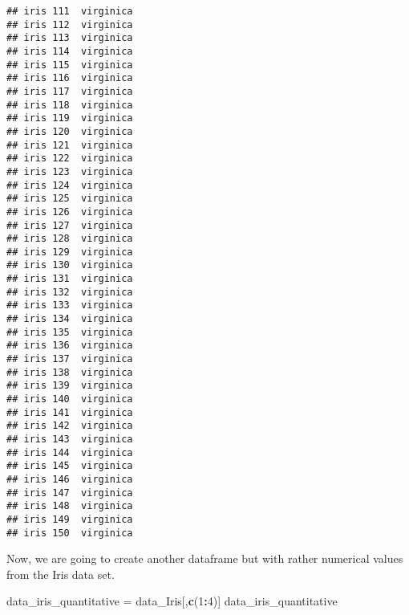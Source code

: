 \documentclass[
]{article}
\newenvironment{Shaded}{\begin{snugshade}}{\end{snugshade}}
\newcommand{\DecValTok}[1]{\textcolor[rgb]{0.00,0.00,0.81}{#1}}
\newcommand{\FunctionTok}[1]{\textcolor[rgb]{0.13,0.29,0.53}{\textbf{#1}}}
\newcommand{\NormalTok}[1]{#1}
\newcommand{\OtherTok}[1]{\textcolor[rgb]{0.56,0.35,0.01}{#1}}
\newcommand{\SpecialCharTok}[1]{\textcolor[rgb]{0.81,0.36,0.00}{\textbf{#1}}}
\begin{document}
\begin{verbatim}
## iris 111  virginica
## iris 112  virginica
## iris 113  virginica
## iris 114  virginica
## iris 115  virginica
## iris 116  virginica
## iris 117  virginica
## iris 118  virginica
## iris 119  virginica
## iris 120  virginica
## iris 121  virginica
## iris 122  virginica
## iris 123  virginica
## iris 124  virginica
## iris 125  virginica
## iris 126  virginica
## iris 127  virginica
## iris 128  virginica
## iris 129  virginica
## iris 130  virginica
## iris 131  virginica
## iris 132  virginica
## iris 133  virginica
## iris 134  virginica
## iris 135  virginica
## iris 136  virginica
## iris 137  virginica
## iris 138  virginica
## iris 139  virginica
## iris 140  virginica
## iris 141  virginica
## iris 142  virginica
## iris 143  virginica
## iris 144  virginica
## iris 145  virginica
## iris 146  virginica
## iris 147  virginica
## iris 148  virginica
## iris 149  virginica
## iris 150  virginica
\end{verbatim}

Now, we are going to create another dataframe but with rather numerical
values from the Iris data set.

\begin{Shaded}
\begin{Highlighting}[]
\NormalTok{data\_iris\_quantitative }\OtherTok{=}\NormalTok{ data\_Iris[,}\FunctionTok{c}\NormalTok{(}\DecValTok{1}\SpecialCharTok{:}\DecValTok{4}\NormalTok{)]}
\NormalTok{data\_iris\_quantitative}
\end{Highlighting}
\end{Shaded}
\end{document}
